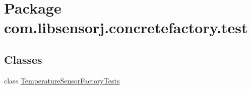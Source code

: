 \hypertarget{namespacecom_1_1libsensorj_1_1concretefactory_1_1test}{}\section{Package com.\+libsensorj.\+concretefactory.\+test}
\label{namespacecom_1_1libsensorj_1_1concretefactory_1_1test}
\subsection*{Classes}
\begin{DoxyCompactItemize}
\item 
class \hyperlink{classcom_1_1libsensorj_1_1concretefactory_1_1test_1_1TemperatureSensorFactoryTests}{Temperature\+Sensor\+Factory\+Tests}
\end{DoxyCompactItemize}

